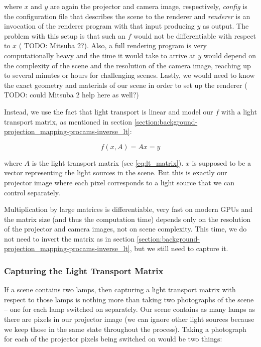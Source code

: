 where \(x\) and \(y\) are again the projector and camera image, respectively, \textit{config} is the configuration file that describes the scene to the renderer and \textit{renderer} is an invocation of the renderer program with that input producing \(y\) as output. The problem with this setup is that such an \(f\) would not be differentiable with respect to \(x\) ({\color{red} TODO: Mitsuba 2?}). Also, a full rendering program is very computationally heavy and the time it would take to arrive at \(y\) would depend on the complexity of the scene and the resolution of the camera image, reaching up to several minutes or hours for challenging scenes. Lastly, we would need to know the exact geometry and materials of our scene in order to set up the renderer ({\color{red} TODO: could Mitsuba 2 help here as well?})

Instead, we use the fact that light transport is linear and model our \(f\) with a light transport matrix, as mentioned in section \ref{section:background-projection_mapping-procams-inverse_lt}:

\begin{equation}
    \label{eq:rendering_function-lt_matrix}
    f(x, A) = Ax = y
\end{equation}

where \(A\) is the light transport matrix (see \ref{eq:lt_matrix}). \(x\) is supposed to be a vector representing the light sources in the scene. But this is exactly our projector image where each pixel corresponds to a light source that we can control separately.

Multiplication by large matrices is differentiable, very fast on modern GPUs and the matrix size (and thus the computation time) depends only on the resolution of the projector and camera images, not on scene complexity. This time, we do not need to invert the matrix as in section \ref{section:background-projection_mapping-procams-inverse_lt}, but we still need to capture it.

\subsubsection{Capturing the Light Transport Matrix}
\label{section:methods-rendering_function-complex-lt_capture}

If a scene contains two lamps, then capturing a light transport matrix with respect to those lamps is nothing more than taking two photographs of the scene -- one for each lamp switched on separately. Our scene contains as many lamps as there are pixels in our projector image (we can ignore other light sources because we keep those in the same state throughout the process). Taking a photograph for each of the projector pixels being switched on would be two things:

